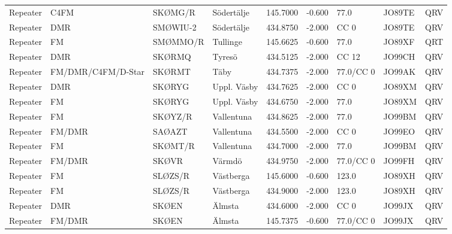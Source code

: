 {\begin{landscape}
\begin{longtable}{llllrrlll}
	Repeater          & C4FM               & SKØMG/R  & Södertälje      &     145.7000 &     -0.600 & 77.0       & JO89TE      & QRV      \\
	Repeater          & DMR                & SMØWIU-2 & Södertälje      &     434.8750 &     -2.000 & CC 0       & JO89TE      & QRV      \\
	Repeater          & FM                 & SMØMMO/R & Tullinge        &     145.6625 &     -0.600 & 77.0       & JO89XF      & QRT      \\
	Repeater          & DMR                & SKØRMQ   & Tyresö          &     434.5125 &     -2.000 & CC 12      & JO99CH      & QRV      \\
	Repeater          & FM/DMR/C4FM/D-Star & SKØRMT   & Täby            &     434.7375 &     -2.000 & 77.0/CC 0  & JO99AK      & QRV      \\
	Repeater          & DMR                & SKØRYG   & Uppl. Väsby     &     434.7625 &     -2.000 & CC 0       & JO89XM      & QRV      \\
	Repeater          & FM                 & SKØRYG   & Uppl. Väsby     &     434.6750 &     -2.000 & 77.0       & JO89XM      & QRV      \\
	Repeater          & FM                 & SKØYZ/R  & Vallentuna      &     434.8625 &     -2.000 & 77.0       & JO99BM      & QRV      \\
	Repeater          & FM/DMR             & SAØAZT   & Vallentuna      &     434.5500 &     -2.000 & CC 0       & JO99EO      & QRV      \\
	Repeater          & FM                 & SKØMT/R  & Vallentuna      &     434.7000 &     -2.000 & 77.0       & JO99BM      & QRV      \\
	Repeater          & FM/DMR             & SKØVR    & Värmdö          &     434.9750 &     -2.000 & 77.0/CC 0  & JO99FH      & QRV      \\
	Repeater          & FM                 & SLØZS/R  & Västberga       &     145.6000 &     -0.600 & 123.0      & JO89XH      & QRV      \\
	Repeater          & FM                 & SLØZS/R  & Västberga       &     434.9000 &     -2.000 & 123.0      & JO89XH      & QRV      \\
	Repeater          & DMR                & SKØEN    & Älmsta          &     434.6000 &     -2.000 & CC 0       & JO99JX      & QRV      \\
	Repeater          & FM/DMR             & SKØEN    & Älmsta          &     145.7375 &     -0.600 & 77.0/CC 0  & JO99JX      & QRV
\end{longtable}



\end{landscape}}
